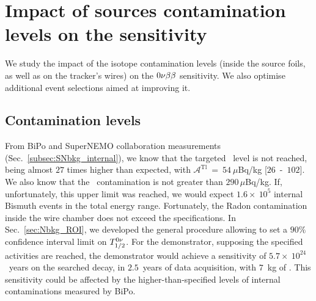 \section{Impact of sources contamination levels on the sensitivity}
\label{sec:demonstrator_sensitivity}

We study the impact of the isotope contamination levels (inside the source foils, as well as on the tracker's wires) on the $0\nu\beta\beta$ sensitivity.
We also optimise additional event selections aimed at improving it.


\subsection{Contamination levels}
\label{subsec:Influence_cont}

From BiPo  and SuperNEMO collaboration measurements (Sec.~\ref{subsec:SNbkg_internal}), we know that the targeted \Tl\ level is not reached, being almost $27$ times higher than expected, with $\mathcal{A}^{\text{Tl}}~=~54~\mu$Bq/kg [$26$~-~$102$].
We also know that the \Bi\ contamination is not greater than $290\,\mu$Bq/kg.
If, unfortunately, this upper limit was reached, we would expect $1.6\times~10^{5}$ internal Bismuth events in the total energy range.
Fortunately, the Radon contamination inside the wire chamber does not exceed the specifications.
In Sec.~\ref{sec:Nbkg_ROI}, we developed the general procedure allowing to set a $90\%$ confidence interval limit on $T_{1/2}^{0\nu}$.
For the demonstrator, supposing the specified activities are reached, the demonstrator would achieve a sensitivity of $5.7\times~10^{24}$~years on the searched decay, in $2.5$~years of data acquisition, with $7$~kg of \Se.
This sensitivity could be affected by the higher-than-specified levels of internal contaminations measured by BiPo.

